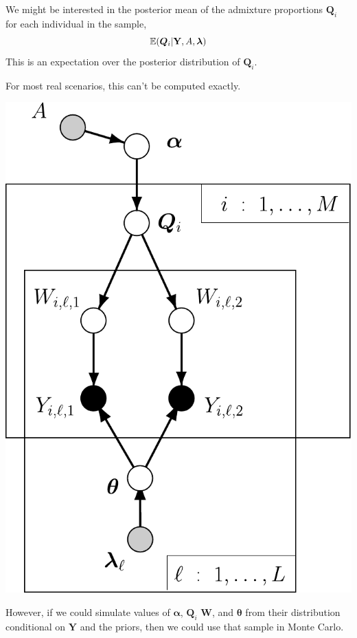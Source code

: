 \begin{minipage}{.47\textwidth}
We might be interested in the posterior mean of the admixture proportions $\bm{Q}_i$ for each 
individual in the sample, \ie{}
\[
	\Exp(\bm{Q}_i|\mathbf{Y},A,\bm{\lambda})
\]
This is an expectation over the posterior distribution of $\bm{Q}_i$.

For most real scenarios, this can't be computed exactly.
\end{minipage}
\hfill
\begin{minipage}{.51\textwidth}
\vfill
\hfill\includegraphics*[width=.95\textwidth]{illus/PritchSimple2.pdf}
\vfill
\end{minipage}
\newpage

However, if we could simulate values of $\bm{\alpha}$, $\bm{Q}_i$ $\mathbf{W}$, and $\bm{\theta}$ from their distribution conditional on $\mathbf{Y}$ and the priors, then we could use that sample in Monte Carlo.  

